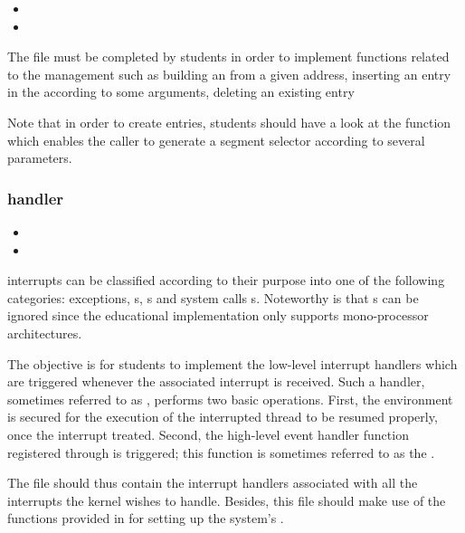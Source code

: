 \begin{itemize}
  \item
  \item
\end{itemize}

The file  must be completed by students in order to
implement functions related to the  management such as building
an  from a given address, inserting an entry in the 
according to some arguments, deleting an existing  entry \etc{}

Note that in order to create  entries, students should have a look
at the function  which enables the
caller to generate a segment selector according to several parameters.

\subsubsection*{handler}

\begin{itemize}
  \item
  \item
\end{itemize}

 interrupts can be classified according to their purpose into
one of the following categories: exceptions, s,
s and system calls \aka{}
s. Noteworthy is that s can be ignored since the
educational implementation only supports mono-processor architectures.

The objective is for students to implement the low-level interrupt handlers
which are triggered whenever the associated interrupt is received. Such a
handler, sometimes referred to as , performs two basic
operations. First, the environment is secured for the execution of the
interrupted thread to be resumed properly, once the interrupt treated.
Second, the high-level event handler function registered through
 is triggered; this function is sometimes referred
to as the .

The file  should thus contain the interrupt handlers
associated with all the interrupts the kernel wishes to handle. Besides,
this file should make use of the functions provided in 
for setting up the system's .

